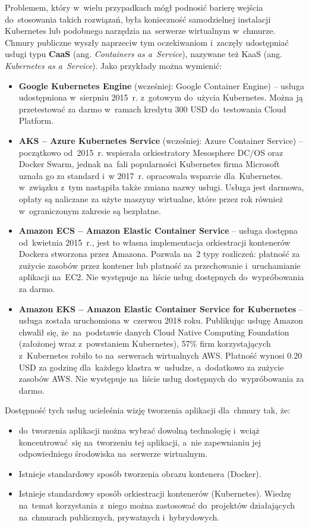 \documentclass[12pt,a4paper,twoside,titlepage,openright]{book}
\begin{document}
Problemem, który w~wielu przypadkach mógł podnosić barierę wejścia do~stosowania takich rozwiązań, była konieczność samodzielnej instalacji Kubernetes lub podobnego narzędzia na~serwerze wirtualnym w~chmurze. Chmury publiczne wyszły naprzeciw tym oczekiwaniom i~zaczęły udostępniać usługi typu \textbf{CaaS} (ang. \textit{Containers as a~Service}), nazywane też KaaS (ang. \textit{Kubernetes as a~Service}). Jako przykłady można wymienić:
\begin{itemize}
\item \textbf{Google Kubernetes Engine} (wcześniej: Google Container Engine) -- usługa udostępniona w~sierpniu 2015~r. \cite{siteGoogleBlogKubernetes} z~gotowym do~użycia Kubernetes. Można ją przetestować za darmo w~ramach kredytu 300 USD do~testowania Cloud Platform.\cite{siteGoogleTry}
\item \textbf{AKS -- Azure Kubernetes Service} (wcześniej: Azure Container Service) -- początkowo od~2015~r. wspierała orkiestratory Mesosphere DC/OS oraz Docker Swarm, jednak na~fali popularności Kubernetes firma Microsoft uznała go za standard i~w 2017~r. opracowała wsparcie dla~Kubernetes. w~związku z~tym nastąpiła także zmiana nazwy usługi. \cite{siteMicrosoftBlogAks} Usługa jest darmowa\cite{siteAksPricing}, opłaty są naliczane za użyte maszyny wirtualne, które przez rok również w~ograniczonym zakresie są bezpłatne.\cite{siteAzureTry}
\item \textbf{Amazon ECS -- Amazon Elastic Container Service} -- usługa dostępna od~kwietnia 2015~r., jest to własna implementacja orkiestracji kontenerów Dockera stworzona przez Amazona. Pozwala na~2 typy rozliczeń: płatność za zużycie zasobów przez kontener lub płatność za przechowanie i~uruchamianie aplikacji na~EC2.\cite{siteAmazonEcsPricing} Nie występuje na~liście usług dostępnych do~wypróbowania za darmo.\cite{siteAmazonTry}
\item \textbf{Amazon EKS -- Amazon Elastic Container Service for Kubernetes} -- usługa została uruchomiona w~czerwcu 2018 roku. Publikując usługę Amazon chwalił się, że~na~podstawie danych Cloud Native Computing Foundation (założonej wraz z~powstaniem Kubernetes), 57\% firm korzystających z~Kubernetes robiło to na~serwerach wirtualnych AWS. Płatność wynosi 0.20 USD za godzinę dla~każdego klastra w~usłudze, a~dodatkowo za zużycie zasobów AWS.\cite{siteAmazonEksPricing} Nie występuje na~liście usług dostępnych do~wypróbowania za darmo.\cite{siteAmazonTry}
\end{itemize}

Dostępność tych usług ucieleśnia wizję tworzenia aplikacji dla~chmury tak,	 że:
\begin{itemize}
\item do~tworzenia aplikacji można wybrać dowolną technologię i~wciąż koncentrować~się na~tworzeniu tej aplikacji, a~nie zapewnianiu jej odpowiedniego środowiska na~serwerze wirtualnym.
\item Istnieje standardowy sposób tworzenia obrazu kontenera (Docker).
\item Istnieje standardowy sposób orkiestracji kontenerów (Kubernetes). Wiedzę na~temat korzystania z~niego można zastosować do~projektów działających na~chmurach publicznych, prywatnych i~hybrydowych.
\end{itemize}
\end{document}
